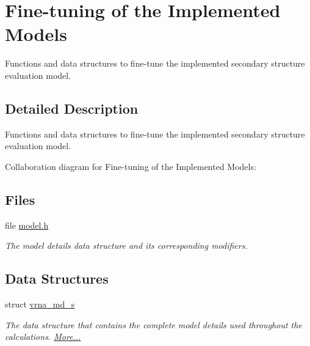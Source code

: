 \hypertarget{group__model__details}{}\section{Fine-\/tuning of the Implemented Models}
\label{group__model__details}


Functions and data structures to fine-\/tune the implemented secondary structure evaluation model.  




\subsection{Detailed Description}
Functions and data structures to fine-\/tune the implemented secondary structure evaluation model. 

Collaboration diagram for Fine-\/tuning of the Implemented Models\+:
\subsection*{Files}
\begin{DoxyCompactItemize}
\item 
file \mbox{\hyperlink{model_8h}{model.\+h}}
\begin{DoxyCompactList}\small\item\em The model details data structure and its corresponding modifiers. \end{DoxyCompactList}\end{DoxyCompactItemize}
\subsection*{Data Structures}
\begin{DoxyCompactItemize}
\item 
struct \mbox{\hyperlink{group__model__details_structvrna__md__s}{vrna\+\_\+md\+\_\+s}}
\begin{DoxyCompactList}\small\item\em The data structure that contains the complete model details used throughout the calculations.  \mbox{\hyperlink{group__model__details_structvrna__md__s}{More...}}\end{DoxyCompactList}\end{DoxyCompactItemize}
